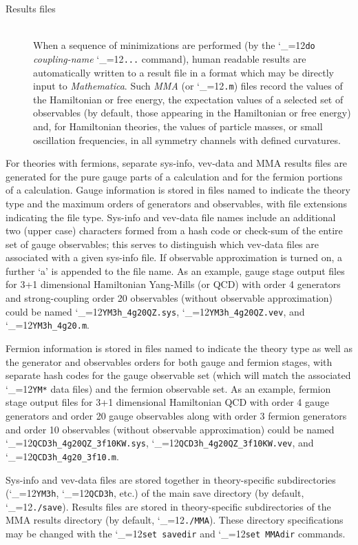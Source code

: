 \documentclass [12pt]{article}
\makeatletter
\renewcommand{\tt}{\begingroup\catcode`_=12\def\_{\string_}\tt@}
\newcommand{\tt@}[1]{\texttt{#1}\endgroup}
\makeatother
\begin{document}
\begin{description}
\item [Results files]~\\
    When a sequence of minimizations are performed
    (by the \tt{do} \textit{coupling-name} \tt{...} command),
    human readable results are automatically written to a
    result file in a format which may be directly input
    to \textsl{Mathematica}.
    Such \textit{MMA} (or \tt{.m}) files record the values
    of the Hamiltonian or free energy, the expectation values
    of a selected set of observables (by default, those
    appearing in the Hamiltonian or free energy) and,
    for Hamiltonian theories, the values of particle masses,
    or small oscillation frequencies, in all symmetry channels
    with defined curvatures.

\end{description}

For theories with fermions,
separate sys-info, vev-data and MMA results files are generated
for the pure gauge parts of a calculation and for the fermion
portions of a calculation.
Gauge information is stored in files named to indicate the
theory type and the maximum orders of generators and observables,
with file extensions indicating the file type.
Sys-info and vev-data file names include an additional two
(upper case) characters formed from a hash code or check-sum
of the entire set of gauge observables;
this serves to distinguish which vev-data files are associated
with a given sys-info file.
If observable approximation is turned on, a further `a'
is appended to the file name.
As an example, gauge stage output files for 3+1 dimensional Hamiltonian
Yang-Mills (or QCD)
with order 4 generators and strong-coupling order 20 observables
(without observable approximation)
could be named
\tt{YM3h_4g20QZ.sys}, 
\tt{YM3h_4g20QZ.vev},  and
\tt{YM3h_4g20.m}.

Fermion information is stored in files named to indicate the 
theory type as well as the generator and observables orders for both
gauge and fermion stages, with separate hash codes for the gauge
observable set (which will match the associated \tt{YM*} data files)
and the fermion observable set.
As an example, fermion stage output files for 3+1 dimensional Hamiltonian
QCD with order 4 gauge generators and order 20 gauge observables
along with order 3 fermion generators and order 10 observables
(without observable approximation)
could be named
\tt{QCD3h_4g20QZ_3f10KW.sys}, 
\tt{QCD3h_4g20QZ_3f10KW.vev},  and
\tt{QCD3h_4g20_3f10.m}.

Sys-info and vev-data files are stored together in theory-specific subdirectories
(\tt{YM3h}, \tt{QCD3h}, etc.) of the main save directory (by default, \tt{./save}).
Results files are stored in theory-specific subdirectories of the
MMA results directory (by default, \tt{./MMA}).
These directory specifications may be changed with the
\tt{set savedir} and \tt{set MMAdir} commands.
\end{document}
